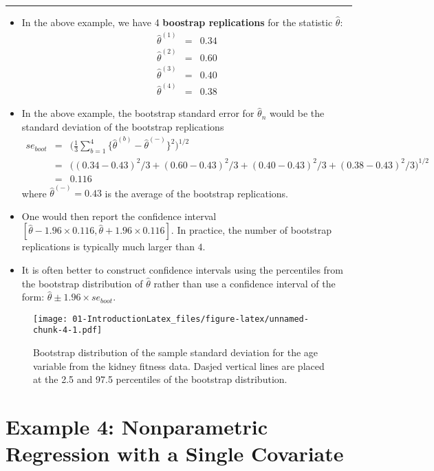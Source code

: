 \documentclass[]{book}
\begin{document}
\begin{center}\rule{0.5\linewidth}{\linethickness}\end{center}

\begin{itemize}
\item
  In the above example, we have 4 \textbf{boostrap replications} for the statistic \(\hat{\theta}\):
  \begin{eqnarray}
  \hat{\theta}^{(1)} &=& 0.34 \\ 
  \hat{\theta}^{(2)} &=& 0.60 \\
  \hat{\theta}^{(3)} &=& 0.40 \\ 
  \hat{\theta}^{(4)} &=& 0.38
  \end{eqnarray}
\item
  In the above example, the bootstrap standard error for \(\hat{\theta}_{n}\) would be
  the standard deviation of the bootstrap replications
  \begin{eqnarray}
  se_{boot} &=& \Big( \frac{1}{3} \sum_{b=1}^{4} \{ \hat{\theta}^{(b)} - \hat{\theta}^{(-)}  \}^{2} \Big)^{1/2} \nonumber \\
  &=& \Big( (0.34 - 0.43)^{2}/3 + (0.60 - 0.43)^{2}/3 + (0.40 - 0.43)^{2}/3 + (0.38 - 0.43)^{2}/3 \Big)^{1/2} \nonumber \\
  &=& 0.116
  \end{eqnarray}
  where \(\hat{\theta}^{(-)} = 0.43\) is the average of the bootstrap replications.
\item
  One would then report the confidence interval \([\hat{\theta} - 1.96 \times 0.116, \hat{\theta} + 1.96 \times 0.116]\).
  In practice, the number of bootstrap replications is typically much larger than \(4\).
\item
  It is often better to construct confidence intervals using the percentiles from the bootstrap distribution
  of \(\hat{\theta}\) rather than use a confidence interval of the form: \(\hat{\theta} \pm 1.96 \times se_{boot}\).
\end{itemize}

\begin{figure}
\centering
\texttt{[image: 01-IntroductionLatex\_files/figure-latex/unnamed-chunk-4-1.pdf]}
\caption{\label{fig:unnamed-chunk-4}Bootstrap distribution of the sample standard deviation for the age variable from the kidney fitness data. Dasjed vertical lines are placed at the 2.5 and 97.5 percentiles of the bootstrap distribution.}
\end{figure}

\hypertarget{sec:example-nonpar-regress1}{%
\section{Example 4: Nonparametric Regression with a Single Covariate}\label{sec:example-nonpar-regress1}}
\end{document}
